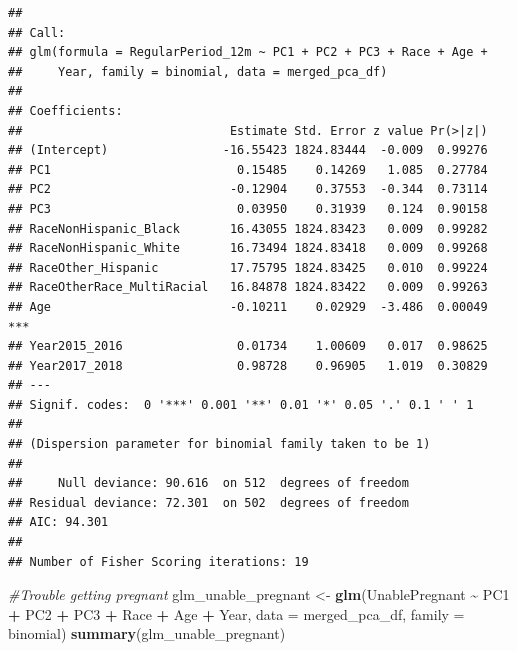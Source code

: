 \documentclass[
]{article}
\newenvironment{Shaded}{\begin{snugshade}}{\end{snugshade}}
\newcommand{\AttributeTok}[1]{\textcolor[rgb]{0.13,0.29,0.53}{#1}}
\newcommand{\CommentTok}[1]{\textcolor[rgb]{0.56,0.35,0.01}{\textit{#1}}}
\newcommand{\FunctionTok}[1]{\textcolor[rgb]{0.13,0.29,0.53}{\textbf{#1}}}
\newcommand{\NormalTok}[1]{#1}
\newcommand{\OtherTok}[1]{\textcolor[rgb]{0.56,0.35,0.01}{#1}}
\newcommand{\SpecialCharTok}[1]{\textcolor[rgb]{0.81,0.36,0.00}{\textbf{#1}}}
\begin{document}
\begin{verbatim}
## 
## Call:
## glm(formula = RegularPeriod_12m ~ PC1 + PC2 + PC3 + Race + Age + 
##     Year, family = binomial, data = merged_pca_df)
## 
## Coefficients:
##                             Estimate Std. Error z value Pr(>|z|)    
## (Intercept)                -16.55423 1824.83444  -0.009  0.99276    
## PC1                          0.15485    0.14269   1.085  0.27784    
## PC2                         -0.12904    0.37553  -0.344  0.73114    
## PC3                          0.03950    0.31939   0.124  0.90158    
## RaceNonHispanic_Black       16.43055 1824.83423   0.009  0.99282    
## RaceNonHispanic_White       16.73494 1824.83418   0.009  0.99268    
## RaceOther_Hispanic          17.75795 1824.83425   0.010  0.99224    
## RaceOtherRace_MultiRacial   16.84878 1824.83422   0.009  0.99263    
## Age                         -0.10211    0.02929  -3.486  0.00049 ***
## Year2015_2016                0.01734    1.00609   0.017  0.98625    
## Year2017_2018                0.98728    0.96905   1.019  0.30829    
## ---
## Signif. codes:  0 '***' 0.001 '**' 0.01 '*' 0.05 '.' 0.1 ' ' 1
## 
## (Dispersion parameter for binomial family taken to be 1)
## 
##     Null deviance: 90.616  on 512  degrees of freedom
## Residual deviance: 72.301  on 502  degrees of freedom
## AIC: 94.301
## 
## Number of Fisher Scoring iterations: 19
\end{verbatim}

\begin{Shaded}
\begin{Highlighting}[]
\CommentTok{\#Trouble getting pregnant}
\NormalTok{glm\_unable\_pregnant }\OtherTok{\textless{}{-}} \FunctionTok{glm}\NormalTok{(UnablePregnant }\SpecialCharTok{\textasciitilde{}}\NormalTok{ PC1 }\SpecialCharTok{+}\NormalTok{ PC2 }\SpecialCharTok{+}\NormalTok{ PC3 }\SpecialCharTok{+}\NormalTok{ Race }\SpecialCharTok{+}\NormalTok{ Age }\SpecialCharTok{+}\NormalTok{ Year, }
                                \AttributeTok{data =}\NormalTok{ merged\_pca\_df, }\AttributeTok{family =}\NormalTok{ binomial)}
\FunctionTok{summary}\NormalTok{(glm\_unable\_pregnant)}
\end{Highlighting}
\end{Shaded}
\end{document}
